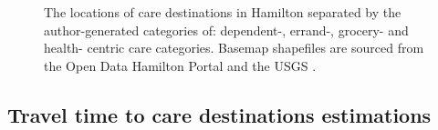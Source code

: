 \documentclass[
  authoryear,
  preprint,
  3p]{elsarticle}
\begin{document}
\begin{figure}


\caption{\label{fig-Fig3}The locations of care destinations in Hamilton
separated by the author-generated categories of: dependent-, errand-,
grocery- and health- centric care categories. Basemap shapefiles are
sourced from the Open Data Hamilton Portal
\citep{opendatahamiltonCityBoundary2023} and the USGS
\citep{greatlakesUSGS2010}.}

\end{figure}%

\subsection{Travel time to care destinations
estimations}\label{travel-time-to-care-destinations-estimations}
\end{document}
